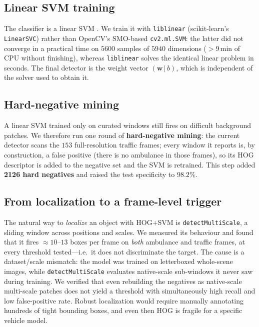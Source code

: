 \documentclass[12pt, a4paper]{article}
\begin{document}
\subsection{Linear SVM training}
The classifier is a linear SVM \cite{cortes1995support}. We train it with
\texttt{liblinear} (scikit-learn's \texttt{LinearSVC}) rather than OpenCV's SMO-based
\texttt{cv2.ml.SVM}: the latter did not converge in a practical time on $5600$ samples of
$5940$ dimensions ($>9$\,min of CPU without finishing), whereas \texttt{liblinear} solves
the identical linear problem in seconds. The final detector is the weight vector
$(\mathbf{w}\,|\,b)$, which is independent of the solver used to obtain it.

\subsection{Hard-negative mining}
\label{sec:mining}
A linear SVM trained only on curated windows still fires on difficult background patches.
We therefore run one round of \textbf{hard-negative mining}: the current detector scans the
$153$ full-resolution traffic frames; every window it reports is, by construction, a false
positive (there is no ambulance in those frames), so its HOG descriptor is added to the
negative set and the SVM is retrained. This step added \textbf{2126 hard negatives} and
raised the test specificity to $98.2\%$.

\subsection{From localization to a frame-level trigger}
\label{sec:trigger}
The natural way to \emph{localize} an object with HOG+SVM is
\texttt{detectMultiScale}, a sliding window across positions and scales. We measured its
behaviour and found that it fires $\approx 10$--$13$ boxes per frame on
\emph{both} ambulance and traffic frames, at every threshold tested---i.e.\ it does not
discriminate the target. The cause is a dataset/scale mismatch: the model was trained on
letterboxed whole-scene images, while \texttt{detectMultiScale} evaluates native-scale
sub-windows it never saw during training. We verified that even rebuilding the negatives as
native-scale multi-scale patches does not yield a threshold with simultaneously high recall
and low false-positive rate. Robust localization would require manually annotating hundreds
of tight bounding boxes, and even then HOG is fragile for a specific vehicle model.
\end{document}
